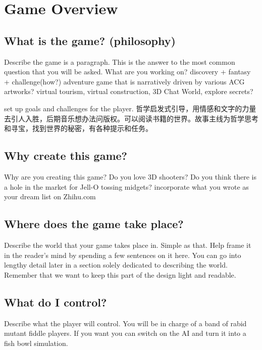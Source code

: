 \documentclass[11pt]{article}
\begin{document}
  \newpage

  \setcounter{tocdepth}{2}
  \renewcommand{\contentsname}{\textsc{Table of Contents}}
  \tableofcontents{}
  \newpage

  \singlespacing

  \section{Game Overview}
    \subsection{What is the game? (philosophy)}
      Describe the game is a paragraph. This is the answer to the most common question that you will be asked. What are you working on?
      discovery + fantasy + challenge(how?) adventure game that is narratively driven by various ACG artworks? virtual tourism, virtual construction, 3D Chat World, explore secrets?

      set up goals and challenges for the player. 哲学启发式引导，用情感和文字的力量去引人入胜，后期音乐想办法问版权。可以阅读书籍的世界。故事主线为哲学思考和寻宝，找到世界的秘密，有各种提示和任务。

    \subsection{Why create this game?}
      Why are you creating this game? Do you love 3D shooters? Do you think there is a hole in the market for Jell-O tossing midgets?
      incorporate what you wrote as your dream list on Zhihu.com

    \subsection{Where does the game take place?}
      Describe the world that your game takes place in. Simple as that. Help frame it in the reader’s mind by spending a few sentences on it here. You can go into lengthy detail later in a section solely dedicated to describing the world. Remember that we want to keep this part of the design light and readable.

    \subsection{What do I control?}
      Describe what the player will control. You will be in charge of a band of rabid mutant fiddle players. If you want you can switch on the AI and turn it into a fish bowl simulation.
\end{document}
